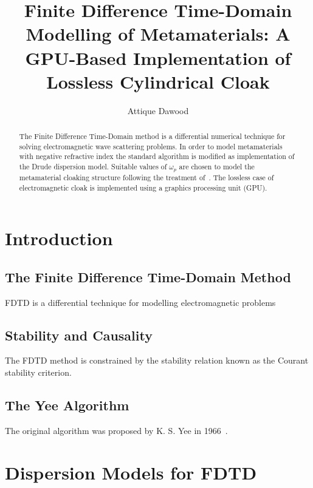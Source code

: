 \documentclass{report}
\begin{document}
\title{Finite Difference Time-Domain Modelling of Metamaterials: A GPU-Based Implementation of Lossless Cylindrical Cloak}
\author{Attique Dawood}
\maketitle

\tableofcontents
\listoffigures

\begin{abstract}
The Finite Difference Time-Domain method is a differential numerical technique for solving electromagnetic wave scattering problems. In order to model metamaterials with negative refractive index the standard algorithm is modified as implementation of the Drude dispersion model. Suitable values of $\omega_p$  are chosen to model the metamaterial cloaking structure following the treatment of~\cite{Radial-Zhao}. The lossless case of electromagnetic cloak is implemented using a graphics processing unit (GPU).
\end{abstract}

\chapter{Introduction}
\section{The Finite Difference Time-Domain Method}

FDTD is a differential technique for modelling electromagnetic problems

\section{Stability and Causality}

The FDTD method is constrained by the stability relation known as the Courant stability criterion.

\section{The Yee Algorithm}

The original algorithm was proposed by K. S. Yee in 1966~\cite{Yee1966}.

\chapter{Dispersion Models for FDTD}
\end{document}

